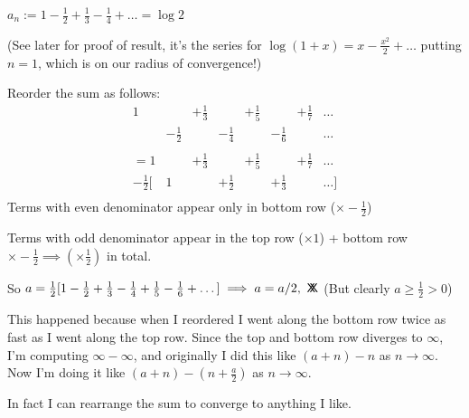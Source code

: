 \documentclass[twoside]{scrartcl}
\newcommand*{\cont}{%
  \mathsf{X}\mkern-8.5mu\mathsf{X}%
}
\begin{document}
\begin{example}
$a_n:= 1 - \frac{1}{2} + \frac{1}{3} - \frac{1}{4} + \dots 	= \log 2$

(See later for proof of result, it's the series for $\log(1+x) = x - \frac{x^2}{2} + \dots$ putting $n=1$, which is on our radius of convergence!)

Reorder the sum as follows:
\[\begin{array}{cccccccc}
	1 & ~ & +\frac{1}{3} & ~ & +\frac{1}{5} & ~ & +\frac{1}{7} & \dots \\
	& -\frac{1}{2} & ~ & -\frac{1}{4} & ~ & -\frac{1}{6} & ~ & \dots \\
	&&&&&&&\\
= 	1 & ~ & +\frac{1}{3} & ~ & +\frac{1}{5} & ~ & +\frac{1}{7} & \dots \\
	-\frac{1}{2} [& 1 & ~ & +\frac{1}{2} & ~ & +\frac{1}{3} & ~ & \dots ]\\

\end{array}\]
Terms with even denominator appear only in bottom row ($\times -\frac{1}{2}$)

Terms with odd denominator appear in the top row ($\times 1$) + bottom row $\times -\frac{1}{2} \implies (\times \frac{1}{2})$ in total. 

So $a = \frac{1}{2}[1-\frac{1}{2} + \frac{1}{3} - \frac{1}{4} + \frac{1}{5} -\frac{1}{6} + \dots] \implies a = a/2,~\cont$ (But clearly $a \geq \frac{1}{2} > 0$)

\end{example}

This happened because when I reordered I went along the bottom row twice as fast as I went along the top row. Since the top and bottom row diverges to $\infty$, I'm computing $\infty - \infty$, and originally I did this like $(a+n) - n$ as $n \to \infty$. Now I'm doing it like $(a + n) - (n + \frac{a}{2})$ as $n \to \infty$. 


In fact I can rearrange the sum to converge to anything I like.\\
\end{document}
